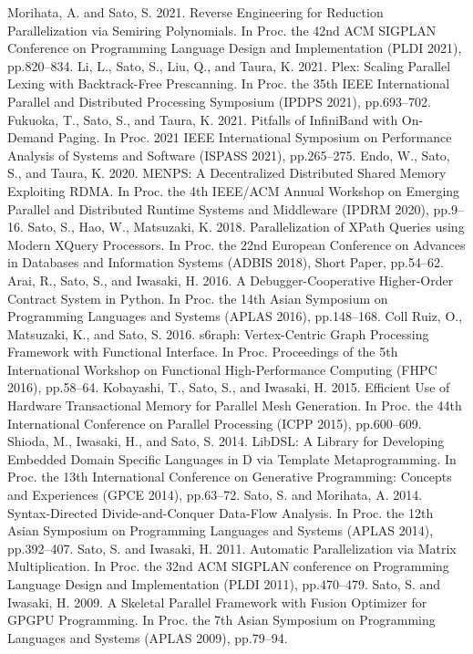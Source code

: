 \documentclass[dvipdfmx]{jsarticle}
\begin{document}
\begin{thebibliography}{100}
  Morihata, A. and Sato, S. 2021. Reverse Engineering for Reduction Parallelization via Semiring Polynomials. In Proc. the 42nd ACM SIGPLAN Conference on Programming Language Design and Implementation (PLDI 2021), pp.820–834.
  Li, L., Sato, S., Liu, Q., and Taura, K. 2021. Plex: Scaling Parallel Lexing with Backtrack-Free Prescanning. In Proc. the 35th IEEE International Parallel and Distributed Processing Symposium (IPDPS 2021), pp.693–702.
  Fukuoka, T., Sato, S., and Taura, K. 2021. Pitfalls of InfiniBand with On-Demand Paging. In Proc. 2021 IEEE International Symposium on Performance Analysis of Systems and Software (ISPASS 2021), pp.265–275.
  Endo, W., Sato, S., and Taura, K. 2020. MENPS: A Decentralized Distributed Shared Memory Exploiting RDMA. In Proc. the 4th IEEE/ACM Annual Workshop on Emerging Parallel and Distributed Runtime Systems and Middleware (IPDRM 2020), pp.9–16.
  Sato, S., Hao, W., Matsuzaki, K. 2018. Parallelization of XPath Queries using Modern XQuery Processors. In Proc. the 22nd European Conference on Advances in Databases and Information Systems (ADBIS 2018), Short Paper, pp.54–62.
  Arai, R., Sato, S., and Iwasaki, H. 2016. A Debugger-Cooperative Higher-Order Contract System in Python. In Proc. the 14th Asian Symposium on Programming Languages and Systems (APLAS 2016), pp.148–168.
  Coll Ruiz, O., Matsuzaki, K., and Sato, S. 2016. s6raph: Vertex-Centric Graph Processing Framework with Functional Interface. In Proc. Proceedings of the 5th International Workshop on Functional High-Performance Computing (FHPC 2016), pp.58–64.
  Kobayashi, T., Sato, S., and Iwasaki, H. 2015. Efficient Use of Hardware Transactional Memory for Parallel Mesh Generation. In Proc. the 44th International Conference on Parallel Processing (ICPP 2015), pp.600–609.
  Shioda, M., Iwasaki, H., and Sato, S. 2014. LibDSL: A Library for Developing Embedded Domain Specific Languages in D via Template Metaprogramming. In Proc. the 13th International Conference on Generative Programming: Concepts and Experiences (GPCE 2014), pp.63–72.
  Sato, S. and Morihata, A. 2014. Syntax-Directed Divide-and-Conquer Data-Flow Analysis. In Proc. the 12th Asian Symposium on Programming Languages and Systems (APLAS 2014), pp.392–407.
  Sato, S. and Iwasaki, H. 2011. Automatic Parallelization via Matrix Multiplication. In Proc. the 32nd ACM SIGPLAN conference on Programming Language Design and Implementation (PLDI 2011), pp.470–479.
  Sato, S. and Iwasaki, H. 2009. A Skeletal Parallel Framework with Fusion Optimizer for GPGPU Programming. In Proc. the 7th Asian Symposium on Programming Languages and Systems (APLAS 2009), pp.79–94.


\end{thebibliography}
\end{document}
